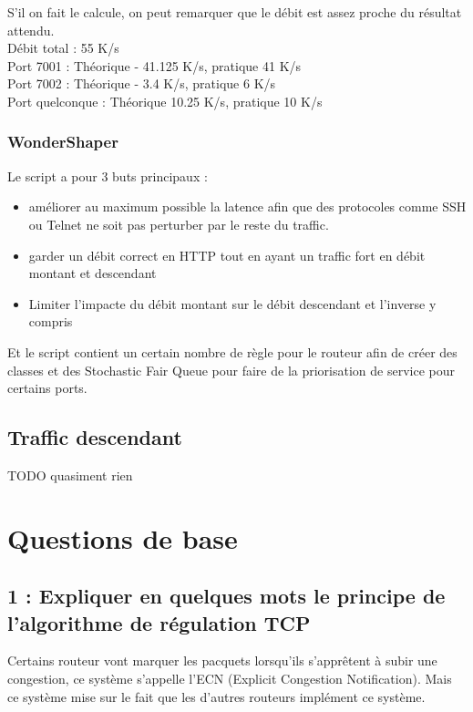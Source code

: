 \documentclass{article}
\begin{document}
S'il on fait le calcule, on peut remarquer que le débit est assez proche du résultat attendu. \\

Débit total : 55 K/s\\
Port 7001 : Théorique - 41.125 K/s, pratique 41 K/s\\
Port 7002 : Théorique - 3.4 K/s, pratique 6 K/s\\
Port quelconque : Théorique 10.25 K/s, pratique 10 K/s

\subsubsection{WonderShaper}

Le script a pour 3 buts principaux : \\

\begin{itemize}
	\item améliorer au maximum possible la latence afin que des protocoles comme SSH ou Telnet ne soit pas perturber par le reste du traffic.
	\item garder un débit correct en HTTP tout en ayant un traffic fort en débit montant et descendant
	\item Limiter l'impacte du débit montant sur le débit descendant et l'inverse y compris
\end{itemize}

Et le script contient un certain nombre de règle pour le routeur afin de créer des classes et des Stochastic Fair Queue pour faire de la priorisation de service pour certains ports.




\subsection{Traffic descendant}
TODO quasiment rien

\section{Questions de base}

\subsection*{1 : Expliquer en quelques mots le principe de l'algorithme de régulation TCP}

Certains routeur vont marquer les pacquets lorsqu'ils s'apprêtent à subir une congestion, ce système s'appelle l'ECN (Explicit Congestion Notification). Mais ce système mise sur le fait que les d'autres routeurs implément ce système. \cite{cours}\\
\end{document}
